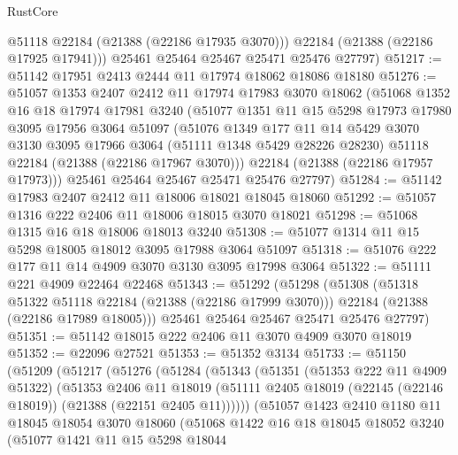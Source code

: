\begin{lexlean}{RustCore}
\begin{coremodule}
          @51118
          @22184
          (@21388 (@22186 @17935 @3070)))
        @22184
        (@21388 (@22186 @17925 @17941)))
      @25461
      @25464
      @25467
      @25471
      @25476
      @27797)
@51217 := @51142 @17951 @2413 @2444 @11 @17974 @18062 @18086 @18180
@51276 := @51057
    @1353
    @2407
    @2412
    @11
    @17974
    @17983
    @3070
    @18062
    (@51068
      @1352
      @16
      @18
      @17974
      @17981
      @3240
      (@51077
        @1351
        @11
        @15
        @5298
        @17973
        @17980
        @3095
        @17956
        @3064
        @51097
        (@51076
          @1349
          @177
          @11
          @14
          @5429
          @3070
          @3130
          @3095
          @17966
          @3064
          (@51111 @1348 @5429 @28226 @28230)
          @51118
          @22184
          (@21388 (@22186 @17967 @3070)))
        @22184
        (@21388 (@22186 @17957 @17973)))
      @25461
      @25464
      @25467
      @25471
      @25476
      @27797)
@51284 := @51142 @17983 @2407 @2412 @11 @18006 @18021 @18045 @18060
@51292 := @51057 @1316 @222 @2406 @11 @18006 @18015 @3070 @18021
@51298 := @51068 @1315 @16 @18 @18006 @18013 @3240
@51308 := @51077 @1314 @11 @15 @5298 @18005 @18012 @3095 @17988 @3064 @51097
@51318 := @51076 @222 @177 @11 @14 @4909 @3070 @3130 @3095 @17998 @3064
@51322 := @51111 @221 @4909 @22464 @22468
@51343 := @51292
    (@51298
      (@51308
        (@51318 @51322 @51118 @22184 (@21388 (@22186 @17999 @3070)))
        @22184
        (@21388 (@22186 @17989 @18005)))
      @25461
      @25464
      @25467
      @25471
      @25476
      @27797)
@51351 := @51142 @18015 @222 @2406 @11 @3070 @4909 @3070 @18019
@51352 := @22096 @27521
@51353 := @51352 @3134
@51733 := @51150
    (@51209
      (@51217
        (@51276
          (@51284
            (@51343
              (@51351
                (@51353 @222 @11 @4909 @51322)
                (@51353
                  @2406
                  @11
                  @18019
                  (@51111 @2405 @18019 (@22145 (@22146 @18019)) (@21388 (@22151 @2405 @11))))))
            (@51057
              @1423
              @2410
              @1180
              @11
              @18045
              @18054
              @3070
              @18060
              (@51068
                @1422
                @16
                @18
                @18045
                @18052
                @3240
                (@51077
                  @1421
                  @11
                  @15
                  @5298
                  @18044

\end{coremodule}
\end{lexlean}
